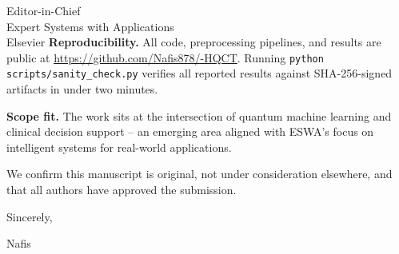 \documentclass[12pt]{letter}
\begin{document}
\begin{letter}{Editor-in-Chief\\Expert Systems with Applications\\Elsevier}
\textbf{Reproducibility.}
All code, preprocessing pipelines, and results are public at
\url{https://github.com/Nafis878/-HQCT}. Running \texttt{python scripts/sanity\_check.py} verifies all reported
results against SHA-256-signed artifacts in under two minutes.

\textbf{Scope fit.}
The work sits at the intersection of quantum machine learning and clinical
decision support -- an emerging area aligned with ESWA's focus on intelligent
systems for real-world applications.

We confirm this manuscript is original, not under consideration elsewhere, and
that all authors have approved the submission.

\closing{Sincerely,}

Nafis\\
[Institution]\\
[Email]\\
[Date]

\end{letter}
\end{document}
